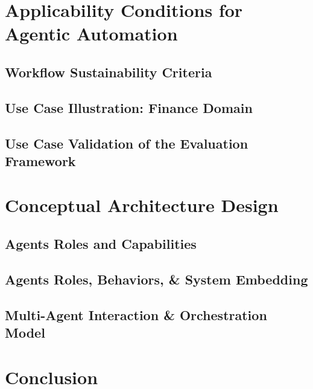 \section{Applicability Conditions for Agentic Automation} 
\subsection{Workflow Sustainability Criteria}
\subsection{Use Case Illustration: Finance Domain}
\subsection{Use Case Validation of the Evaluation Framework}
\newpage  
\section{Conceptual Architecture Design}\label{sec:5architectDesign}
\subsection{Agents Roles and Capabilities}
\subsection{Agents Roles, Behaviors, \& System Embedding}
\subsection{Multi-Agent Interaction \& Orchestration Model}\label{sec:conceptualarchitecture}
\newpage 
\section{Conclusion}
